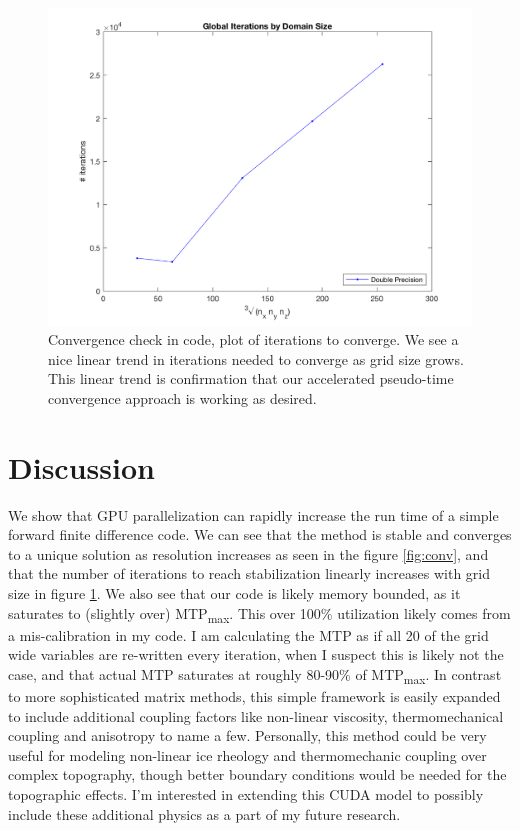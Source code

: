\begin{figure}[h!]
\begin{center}
	\includegraphics[width = .6\textwidth]{../3dvis/iterations.png}
	\caption{\myfont Convergence check in code, plot of iterations to converge. We see a nice linear trend in iterations needed to converge as grid size grows. This linear trend is confirmation that our accelerated pseudo-time convergence approach is working as desired.}
	\label{fig:its}
\end{center}
\end{figure}
\section*{\myfont Discussion} %
We show that GPU parallelization can rapidly increase the run time of a simple forward finite difference code. We can see that the method is stable and converges to a unique solution as resolution increases as seen in the figure \ref{fig:conv}, and that the number of iterations to reach stabilization linearly increases with grid size in figure \ref{fig:its}. We also see that our code is likely memory bounded, as it saturates to (slightly over) MTP\textsubscript{max}. This over 100\% utilization likely comes from a mis-calibration in my code. I am calculating the MTP as if all 20 of the grid wide variables are re-written every iteration, when I suspect this is likely not the case, and that actual MTP saturates at roughly 80-90\% of MTP\textsubscript{max}. 
In contrast to more sophisticated matrix methods, this simple framework is easily expanded to include additional coupling factors like non-linear viscosity, thermomechanical coupling and anisotropy to name a few. Personally, this method could be very useful for modeling non-linear ice rheology and thermomechanic coupling over complex topography, though better boundary conditions would be needed for the topographic effects. I'm interested in extending this CUDA model to possibly include these additional physics as a part of my future research.
